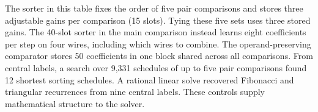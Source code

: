 The sorter in this table fixes the order of five pair comparisons and stores three adjustable gains per comparison (15 slots). Tying these five sets uses three stored gains. The 40-slot sorter in the main comparison instead learns eight coefficients per step on four wires, including which wires to combine. The operand-preserving comparator stores 50 coefficients in one block shared across all comparisons. From central labels, a search over 9,331 schedules of up to five pair comparisons found 12 shortest sorting schedules. A rational linear solve recovered Fibonacci and triangular recurrences from nine central labels. These controls supply mathematical structure to the solver.
